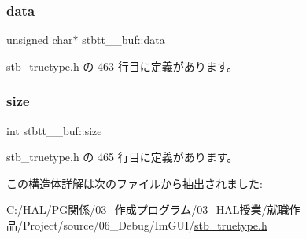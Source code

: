 \subsubsection{\texorpdfstring{data}{data}}
{\footnotesize\ttfamily unsigned char$\ast$ stbtt\+\_\+\+\_\+buf\+::data}



 stb\+\_\+truetype.\+h の 463 行目に定義があります。

\mbox{\label{structstbtt____buf_a0f6f2d06981ab4a5697233bbd0cafb5b}} 
\subsubsection{\texorpdfstring{size}{size}}
{\footnotesize\ttfamily int stbtt\+\_\+\+\_\+buf\+::size}



 stb\+\_\+truetype.\+h の 465 行目に定義があります。



この構造体詳解は次のファイルから抽出されました\+:\begin{DoxyCompactItemize}
\item 
C\+:/\+H\+A\+L/\+P\+G関係/03\+\_\+作成プログラム/03\+\_\+\+H\+A\+L授業/就職作品/\+Project/source/06\+\_\+\+Debug/\+Im\+G\+U\+I/\mbox{\hyperlink{stb__truetype_8h}{stb\+\_\+truetype.\+h}}\end{DoxyCompactItemize}

